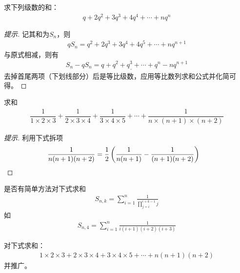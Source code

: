 \begin{example}
  求下列级数的和：
  \begin{align*}
    q + 2q^2 + 3q^3 + 4q^4 + \cdots + nq^n
  \end{align*}
\end{example}
\begin{proof}[提示]
  记其和为$S_n$，则
  \begin{align*}
    qS_n = q^2 + 2q^3 + 3q^4 + 4q^5 + \cdots + nq^{n+1}
  \end{align*}
  与原式相减，则有
  \begin{align*}
    S_n - qS_n = \underline{q + q^2 + q^3 + \cdots + q^n} - nq^{n+1}
  \end{align*}
  去掉首尾两项（下划线部分）后是等比级数，应用等比数列求和公式并化简可得。
\end{proof}

\begin{example}
  求和
  \begin{align*}
    \dfrac1{1\times2\times3} + \dfrac1{2\times3\times4} + \dfrac1{3\times4\times5} + \cdots + \dfrac1{n\times(n+1)\times(n+2)}
  \end{align*}
\end{example}
\begin{proof}[提示]
  利用下式拆项
  \begin{align*}
    \frac1{n(n+1)(n+2)} = \frac12 \left(\frac1{n(n+1)} - \frac1{(n+1)(n+2)}\right)&\qedhere
  \end{align*}
\end{proof}

\begin{example}[推广]
  是否有简单方法对下式求和
  \begin{align*}
    S_{n,k}=\sum_{i=1}^{n} \frac1{\prod_{j=i}^{i+k-1} j}
  \end{align*}
  如
  \begin{align*}
    S_{n,4} = \sum_{i=1}^{n}\frac1{i(i+1)(i+2)(i+3)}
  \end{align*}
\end{example}

\begin{example}
  对下式求和：
  \begin{align*}
    1\times2\times3 + 2\times3\times4 + 3\times4\times5 + \cdots + n(n+1)(n+2)
  \end{align*}
  并推广。
\end{example}


